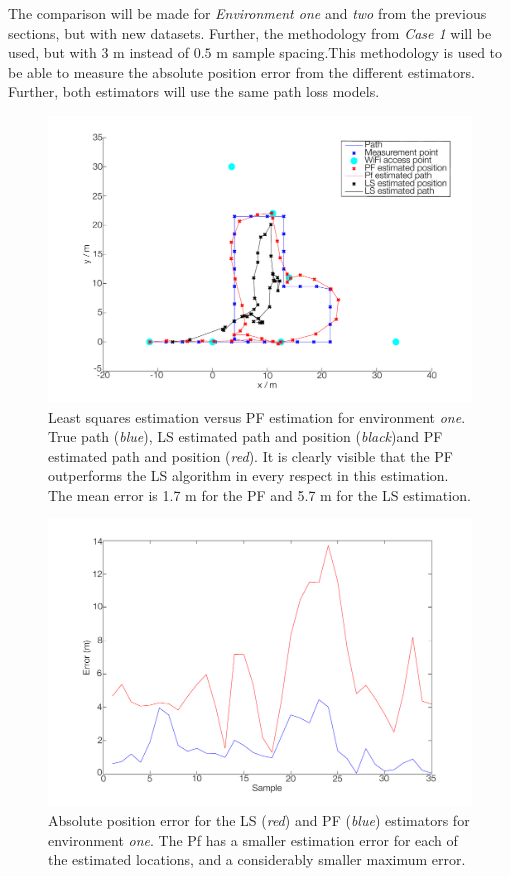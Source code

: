 \documentclass{LTHthesis}
\begin{document}
The comparison will be made for \emph{Environment one} and \emph{two} from the previous sections, but with new datasets. Further, the methodology from \emph{Case 1} will be used, but with 3 m instead of $0.5$ m sample spacing.This methodology is used to be able to measure the absolute position error from the different estimators. Further, both estimators will use the same path loss models.   
%
\begin{figure}[!hbt]

\includegraphics[width=1\textwidth ]{images/pure_rssi/ls_short_path}
\caption{Least squares estimation versus PF estimation for environment \emph{one}. True path (\emph{blue}), LS estimated path and position (\emph{black})and PF estimated path and position (\emph{red}). It is clearly visible that the PF outperforms the LS algorithm in every respect in this estimation. The mean error is 1.7 m for the PF and 5.7 m for the LS estimation.}\label{ls_short}
\end{figure}
%
\begin{figure}[!hbt]

\includegraphics[width=1\textwidth ]{images/pure_rssi/ls_error_short}
\caption{Absolute position error for the LS (\emph{red}) and PF (\emph{blue}) estimators for environment \emph{one}. The Pf has a smaller estimation error for each of the estimated locations, and a considerably smaller maximum error.}\label{ls_error_short}
\end{figure}
\end{document}
